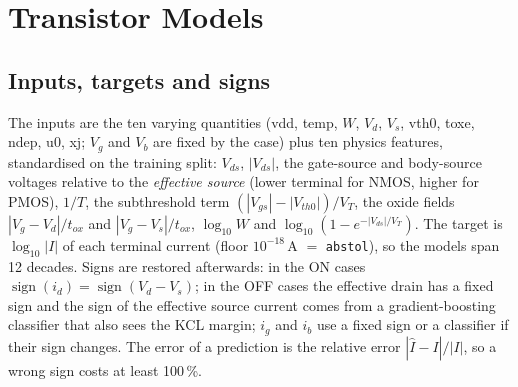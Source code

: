 \section{Transistor Models}\label{sec:models}

\subsection{Inputs, targets and signs}\label{sec:models:io}
The inputs are the ten varying quantities (vdd, temp, $W$, $V_d$, $V_s$, vth0, toxe, ndep, u0, xj; $V_g$ and $V_b$ are fixed by the case) plus ten physics features, standardised on the training split: $V_{ds}$, $|V_{ds}|$, the gate-source and body-source voltages relative to the \emph{effective source} (lower terminal for NMOS, higher for PMOS), $1/T$, the subthreshold term $(|V_{gs}|-|V_{th0}|)/V_T$, the oxide fields $|V_g-V_d|/t_{ox}$ and $|V_g-V_s|/t_{ox}$, $\log_{10}W$ and $\log_{10}(1-e^{-|V_{ds}|/V_T})$.
The target is $\log_{10}|I|$ of each terminal current (floor $10^{-18}$\,\si{\ampere} $=$ \texttt{abstol}), so the models span 12 decades. Signs are restored afterwards: in the ON cases $\operatorname{sign}(i_d)=\operatorname{sign}(V_d-V_s)$; in the OFF cases the effective drain has a fixed sign and the sign of the effective source current comes from a gradient-boosting classifier that also sees the KCL margin; $i_g$ and $i_b$ use a fixed sign or a classifier if their sign changes. The error of a prediction is the relative error $|{\hat I}-I|/|I|$, so a wrong sign costs at least 100\,\%.

